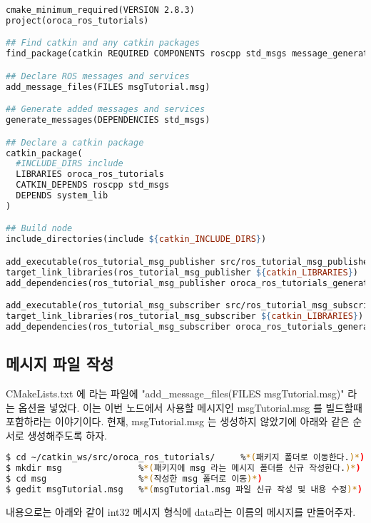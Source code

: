\begin{lstlisting}[language=make]
cmake_minimum_required(VERSION 2.8.3)
project(oroca_ros_tutorials)

## Find catkin and any catkin packages
find_package(catkin REQUIRED COMPONENTS roscpp std_msgs message_generation)

## Declare ROS messages and services
add_message_files(FILES msgTutorial.msg)

## Generate added messages and services
generate_messages(DEPENDENCIES std_msgs)

## Declare a catkin package
catkin_package(
  #INCLUDE_DIRS include
  LIBRARIES oroca_ros_tutorials
  CATKIN_DEPENDS roscpp std_msgs
  DEPENDS system_lib
)

## Build node
include_directories(include ${catkin_INCLUDE_DIRS})

add_executable(ros_tutorial_msg_publisher src/ros_tutorial_msg_publisher.cpp)
target_link_libraries(ros_tutorial_msg_publisher ${catkin_LIBRARIES})
add_dependencies(ros_tutorial_msg_publisher oroca_ros_tutorials_generate_messages_cpp)

add_executable(ros_tutorial_msg_subscriber src/ros_tutorial_msg_subscriber.cpp)
target_link_libraries(ros_tutorial_msg_subscriber ${catkin_LIBRARIES})
add_dependencies(ros_tutorial_msg_subscriber oroca_ros_tutorials_generate_messages_cpp)
\end{lstlisting}

\subsection{메시지 파일 작성}

CMakeLists.txt 에 라는 파일에 "add\_message\_files(FILES msgTutorial.msg)" 라는 옵션을 넣었다. 이는 이번 노드에서 사용할 메시지인 msgTutorial.msg 를 빌드할때 포함하라는 이야기이다. 현재, msgTutorial.msg 는 생성하지 않았기에 아래와 같은 순서로 생성해주도록 하자.

\begin{lstlisting}[language=bash]
$ cd ~/catkin_ws/src/oroca_ros_tutorials/     %*(패키지 폴더로 이동한다.)*)
$ mkdir msg               %*(패키지에 msg 라는 메시지 폴더를 신규 작성한다.)*)
$ cd msg                  %*(작성한 msg 폴더로 이동)*)
$ gedit msgTutorial.msg   %*(msgTutorial.msg 파일 신규 작성 및 내용 수정)*)
\end{lstlisting}

내용으로는 아래와 같이 int32 메시지 형식에 data라는 이름의 메시지를 만들어주자.

